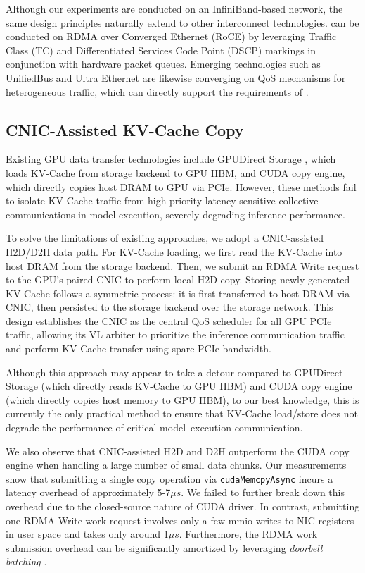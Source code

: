 Although our experiments are conducted on an InfiniBand-based network, the same design principles naturally extend to other interconnect technologies.  
\sysname can be conducted on RDMA over Converged Ethernet (RoCE) by leveraging Traffic Class (TC) and Differentiated Services Code Point (DSCP) markings \cite{sigcomm16:rocev2,Carpenter2002DifferentiatedSI} in conjunction with hardware packet queues.  
Emerging technologies such as UnifiedBus \cite{unifiedbus} and Ultra Ethernet \cite{uec-spec} are likewise converging on QoS mechanisms for heterogeneous traffic, which can directly support the requirements of \sysname.

\subsection{CNIC-Assisted KV-Cache Copy}

Existing GPU data transfer technologies include GPUDirect Storage \cite{nvidia2026gds}, which loads KV-Cache from storage backend to GPU HBM, and CUDA copy engine, which directly copies host DRAM to GPU via PCIe. However, these methods fail to isolate KV-Cache traffic from high-priority latency-sensitive collective communications in model execution, severely degrading inference performance.

To solve the limitations of existing approaches, we adopt a CNIC-assisted H2D/D2H data path. For KV-Cache loading, we first read the KV-Cache into host DRAM from the storage backend. Then, we submit an RDMA Write request to the GPU's paired CNIC to perform local H2D copy. Storing newly generated KV-Cache follows a symmetric process: it is first transferred to host DRAM via CNIC, then persisted to the storage backend over the storage network. This design establishes the CNIC as the central QoS scheduler for all GPU PCIe traffic, allowing its VL arbiter to prioritize the inference communication traffic and perform KV-Cache transfer using spare PCIe bandwidth. 

Although this approach may appear to take a detour compared to GPUDirect Storage (which directly reads KV-Cache to GPU HBM) and CUDA copy engine (which directly copies host memory to GPU HBM), to our best knowledge, this is currently the only practical method to ensure that KV-Cache load/store does not degrade the performance of critical model--execution communication.

We also observe that CNIC-assisted H2D and D2H outperform the CUDA copy engine when handling a large number of small data chunks. Our measurements show that submitting a single copy operation via \texttt{cudaMemcpyAsync} incurs a latency overhead of approximately {5}-{7}$\mu s$. We failed to further break down this overhead due to the closed-source nature of CUDA driver. In contrast, submitting one RDMA Write work request involves only a few mmio writes to NIC registers in user space and takes only around {1}$\mu s$. Furthermore, the RDMA work submission overhead can be significantly amortized by leveraging \emph{doorbell batching} \cite{kalia2016design}.
